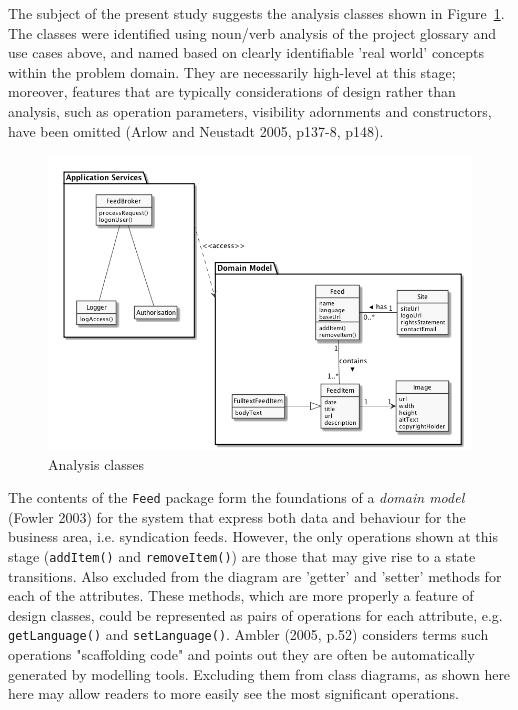 \documentclass{article}
\begin{document}
The subject of the present study suggests the analysis classes shown in Figure~\ref{analysis-classes}. The classes were identified using noun/verb analysis of the project glossary and use cases above, and named based on clearly identifiable 'real world' concepts within the problem domain. They are necessarily high-level at this stage; moreover, features that are typically considerations of design rather than analysis, such as operation parameters, visibility adornments and constructors, have been omitted (Arlow and Neustadt 2005, p137-8, p148).

\begin{figure}
  \begin{center}
    \includegraphics[width=\textwidth]{analysis-classes.png}
  \end{center}
  \label{analysis-classes}
  \caption{Analysis classes}
\end{figure}

The contents of the \texttt{Feed} package form the foundations of a \textit{domain model} (Fowler 2003) for the system that express both data and behaviour for the business area, i.e. syndication feeds. However, the only operations shown at this stage (\texttt{addItem()} and \texttt{removeItem()}) are those that may give rise to a state transitions. Also excluded from the diagram are 'getter' and 'setter' methods for each of the attributes. These methods, which are more properly a feature of design classes, could be represented as pairs of operations for each attribute, e.g. \texttt{getLanguage()} and \texttt{setLanguage()}. Ambler (2005, p.52) considers terms such operations "scaffolding code" and points out they are often be automatically generated by modelling tools. Excluding them from class diagrams, as shown here here may allow readers to more easily see the most significant operations.
\end{document}
